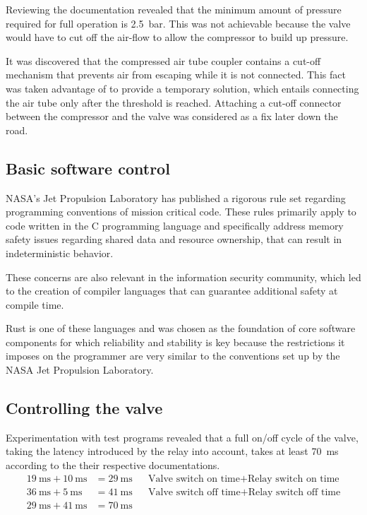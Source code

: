 Reviewing the documentation revealed that the minimum amount of pressure required for full operation is \SI{2,5}{\bar}. This was not achievable because the valve would have to cut off the air-flow to allow the compressor to build up pressure.

It was discovered that the compressed air tube coupler contains a cut-off mechanism that prevents air from escaping while it is not connected. This fact was taken advantage of to provide a temporary solution, which entails connecting the air tube only after the threshold is reached. Attaching a cut-off connector between the compressor and the valve was considered as a fix later down the road.


\subsection{Basic software control}
NASA's Jet Propulsion Laboratory \cite{jpl} has published a rigorous rule set \cite{jpl-rules} regarding programming conventions of mission critical code. These rules primarily apply to code written in the C programming language and specifically address memory safety issues regarding shared data and resource ownership, that can result in indeterministic behavior. 

These concerns are also relevant in the information security community, which led to the creation of compiler languages that can guarantee additional safety at compile time. 

Rust \cite{rust} is one of these languages and was chosen as the foundation of core software components for which reliability and stability is key because the restrictions it imposes on the programmer are very similar to the conventions set up by the NASA Jet Propulsion Laboratory.

\subsection{Controlling the valve}
Experimentation with test programs revealed that a full on/off cycle of the valve, taking the latency introduced by the relay into account, takes at least \SI{70}{\milli\second} according to the their respective documentations. 
\begin{align*}
    \SI{19}{\milli\second} + \SI{10}{\milli\second} &=\SI{29}{\milli\second} && \text{Valve switch on time} + \text{Relay switch on time} \\
    \SI{36}{\milli\second} + \SI{5}{\milli\second}  &=\SI{41}{\milli\second} && \text{Valve switch off time} + \text{Relay switch off time}\\
    \SI{29}{\milli\second} + \SI{41}{\milli\second} &=\SI{70}{\milli\second} 
\end{align*}

